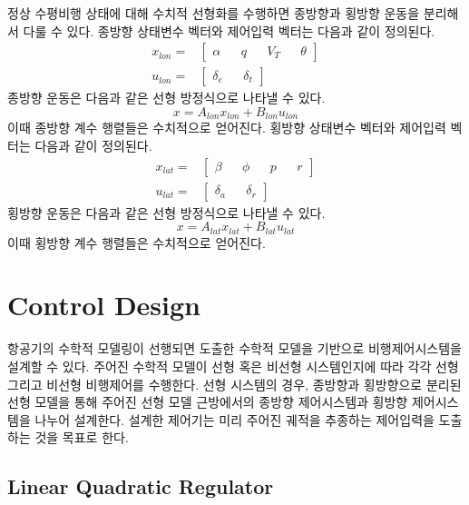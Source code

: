 \documentclass[a4paper, 12pt]{report}
\begin{document}
	정상 수평비행 상태에 대해 수치적 선형화를 수행하면 종방향과 횡방향 운동을 분리해서 다룰 수 있다.
	종방향 상태변수 벡터와 제어입력 벡터는 다음과 같이 정의된다.
	\begin{align}
		x_{lon} =& \begin{bmatrix}
			\alpha && q && V_T && \theta
		\end{bmatrix} \\
		u_{lon} =& \begin{bmatrix}
			\delta_e && \delta_t
		\end{bmatrix}
	\end{align}
	종방향 운동은 다음과 같은 선형 방정식으로 나타낼 수 있다.
	\begin{equation}
		x=A_{lon} x_{lon}+B_{lon} u_{lon}
	\end{equation}
	이때 종방향 계수 행렬들은 수치적으로 얻어진다.
	횡방향 상태변수 벡터와 제어입력 벡터는 다음과 같이 정의된다.
	\begin{align}
		x_{lat} =& \begin{bmatrix}
			\beta && \phi && p && r
		\end{bmatrix} \\
		u_{lat} =& \begin{bmatrix}
			\delta_a && \delta_r
		\end{bmatrix}
	\end{align}
	횡방향 운동은 다음과 같은 선형 방정식으로 나타낼 수 있다.
	\begin{equation}
		x=A_{lat} x_{lat}+B_{lat} u_{lat}
	\end{equation}
	이때 횡방향 계수 행렬들은 수치적으로 얻어진다.	
	
	\chapter{Control Design}
	
	항공기의 수학적 모델링이 선행되면 도출한 수학적 모델을 기반으로 비행제어시스템을 설계할 수 있다.
	주어진 수학적 모델이 선형 혹은 비선형 시스템인지에 따라 각각 선형 그리고 비선형 비행제어를 수행한다.
	선형 시스템의 경우, 종방향과 횡방향으로 분리된 선형 모델을 통해 주어진 선형 모델 근방에서의 종방향 제어시스템과 횡방향 제어시스템을 나누어 설계한다.
	설계한 제어기는 미리 주어진 궤적을 추종하는 제어입력을 도출하는 것을 목표로 한다.
	
	\section{Linear Quadratic Regulator}
	
\end{document}
